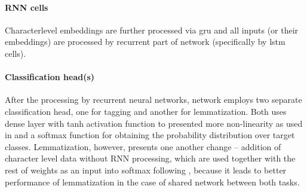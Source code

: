 \paragraph{RNN cells}
Characterlevel embeddings are further processed via \acrfull{gru} and all inputs (or their embeddings) are processed by recurrent part of network (specifically by \acrfull{lstm} cells).

\paragraph{Classification head(s)}
After the processing by recurrent neural networks, network employs two separate classification head, one for tagging and another for lemmatization. Both uses dense layer with tanh activation function to presented more non-linearity as used in \citep{2018} and a softmax function for obtaining the probability distribution over target classes. Lemmatization, however, presents one another change -- addition of character level data without RNN processing, which are used together with the rest of weights as an input into softmax following \citep{Straka2018}, because it leads to better performance of lemmatization in the case of shared network between both tasks.


